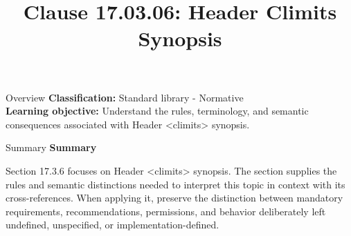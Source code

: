 \documentclass[10pt,letterpaper]{article}
\title{Clause 17.03.06: Header Climits Synopsis}
\author{}
\date{}
\begin{document}
\maketitle
\begin{CornellOverviewBox}{Overview}
\textbf{Classification:} Standard library - Normative\\[2pt]
\textbf{Learning objective:} Understand the rules, terminology, and semantic consequences associated with Header <climits> synopsis.
\end{CornellOverviewBox}\begin{CornellSummaryBox}{Summary}
{\sffamily\bfseries\color{Accent} Summary}\par\vspace{3pt}Section 17.3.6 focuses on Header <climits> synopsis. The section supplies the rules and semantic distinctions needed to interpret this topic in context with its cross-references. When applying it, preserve the distinction between mandatory requirements, recommendations, permissions, and behavior deliberately left undefined, unspecified, or implementation-defined.
\end{CornellSummaryBox}
\end{document}

